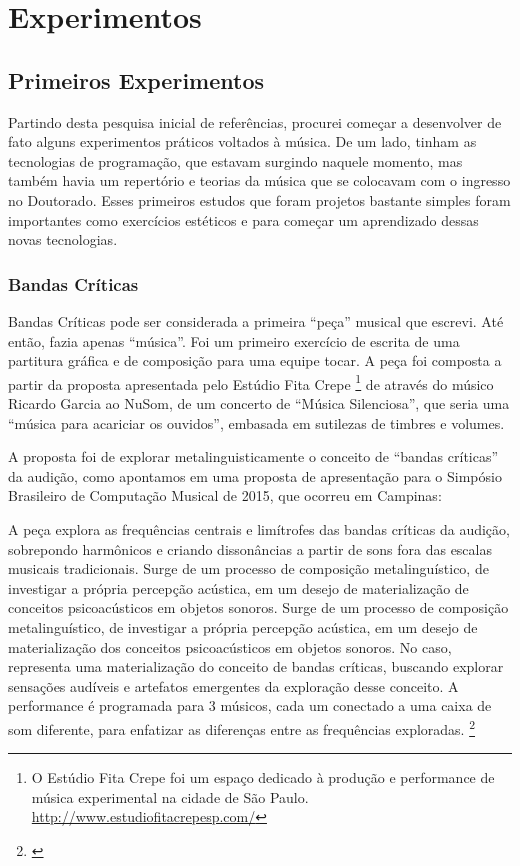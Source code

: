 

\chapter{Experimentos}
\label{ch:experimentos}


\section{Primeiros Experimentos}
Partindo desta pesquisa inicial de referências, procurei começar a desenvolver de fato alguns experimentos práticos voltados à música.  De um lado, tinham as tecnologias de programação, que estavam surgindo naquele momento, mas também havia um repertório e teorias da música que se colocavam com o ingresso no Doutorado. Esses primeiros estudos que foram projetos bastante simples foram importantes como exercícios estéticos e para começar um aprendizado dessas novas tecnologias.


\subsection{Bandas Críticas}
Bandas Críticas pode ser considerada a primeira ``peça'' musical que escrevi. Até então, fazia apenas ``música''. Foi um primeiro exercício de escrita de uma partitura gráfica e de composição para uma equipe tocar. A peça foi composta a partir da proposta apresentada pelo Estúdio Fita Crepe \footnote{O Estúdio Fita Crepe foi um espaço dedicado à produção e performance de música experimental na cidade de São Paulo. \url{http://www.estudiofitacrepesp.com/}} de através do músico Ricardo Garcia ao NuSom, de um concerto de ``Música Silenciosa'', que seria uma ``música para acariciar os ouvidos'', embasada em sutilezas de timbres e volumes.

A proposta foi de explorar metalinguisticamente o conceito de ``bandas críticas'' da audição, como apontamos em uma proposta de apresentação para o Simpósio Brasileiro de Computação Musical de 2015, que ocorreu em Campinas:


\begin{citacao}
A peça explora as frequências centrais e limítrofes das bandas críticas da audição, sobrepondo harmônicos e criando dissonâncias a partir de sons fora das escalas musicais tradicionais. Surge de um processo de composição metalinguístico, de investigar a própria percepção acústica, em um desejo de materialização de conceitos psicoacústicos em objetos sonoros. 
Surge de um processo de composição metalinguístico, de investigar a própria percepção acústica, em um desejo de materialização dos conceitos psicoacústicos em objetos sonoros. No caso, representa uma materialização do conceito de bandas críticas, buscando explorar sensações audíveis e artefatos emergentes da exploração desse conceito. A performance é programada para 3 músicos, cada um conectado a uma caixa de som diferente, para enfatizar as diferenças entre as frequências exploradas. \footnote{\cite{ArianeStolfi2015}}
\end{citacao}


